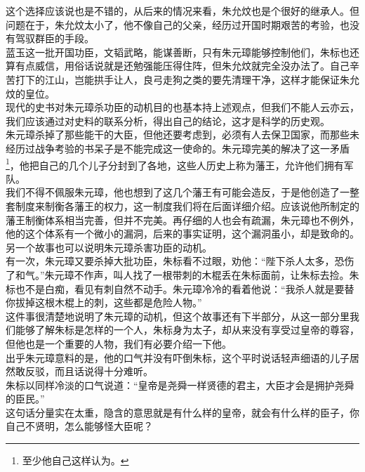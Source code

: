 \begin{multicols}{\theparacolNo}
这个选择应该说也是不错的，从后来的情况来看，朱允炆也是个很好的继承人。但问题在于，朱允炆太小了，他不像自己的父亲，经历过开国时期艰苦的考验，也没有驾驭群臣的手段。\\

蓝玉这一批开国功臣，文韬武略，能谋善断，只有朱元璋能够控制他们，朱标也还算有点威信，用俗话说就是还勉强能压得住阵，但朱允炆就完全没办法了。自己辛苦打下的江山，岂能拱手让人，良弓走狗之类的要先清理干净，这样才能保证朱允炆的皇位。\\

现代的史书对朱元璋杀功臣的动机目的也基本持上述观点，但我们不能人云亦云，我们应该通过对史料的联系分析，得出自己的结论，这才是科学的历史观。\\

朱元璋杀掉了那些能干的大臣，但他还要考虑到，必须有人去保卫国家，而那些未经历过战争考验的书呆子是不能完成这一使命的。朱元璋完美的解决了这一矛盾\footnote{至少他自己这样认为。}，他把自己的几个儿子分封到了各地，这些人历史上称为藩王，允许他们拥有军队。\\

我们不得不佩服朱元璋，他也想到了这几个藩王有可能会造反，于是他创造了一整套制度来制衡各藩王的权力，这一制度我们将在后面详细介绍。应该说他所制定的藩王制衡体系相当完善，但并不完美。再仔细的人也会有疏漏，朱元璋也不例外，他的这个体系有一个微小的漏洞，后来的事实证明，这个漏洞虽小，却是致命的。\\

另一个故事也可以说明朱元璋杀害功臣的动机。\\

有一次，朱元璋又要杀掉大批功臣，朱标看不过眼，劝他：“陛下杀人太多，恐伤了和气。”朱元璋不作声，叫人找了一根带刺的木棍丢在朱标面前，让朱标去捡。朱标也不是白痴，看见有刺自然不动手。朱元璋冷冷的看着他说：“我杀人就是要替你拔掉这根木棍上的刺，这些都是危险人物。”\\

这件事很清楚地说明了朱元璋的动机，但这个故事还有下半部分，从这一部分里我们能够了解朱标是怎样的一个人，朱标身为太子，却从来没有享受过皇帝的尊容，但他也是一个重要的人物，我们有必要介绍一下他。\\

出乎朱元璋意料的是，他的口气并没有吓倒朱标，这个平时说话轻声细语的儿子居然敢反驳，而且话说得十分难听。\\

朱标以同样冷淡的口气说道：“皇帝是尧舜一样贤德的君主，大臣才会是拥护尧舜的臣民。”\\

这句话分量实在太重，隐含的意思就是有什么样的皇帝，就会有什么样的臣子，你自己不贤明，怎么能够怪大臣呢？\\


\end{multicols}
